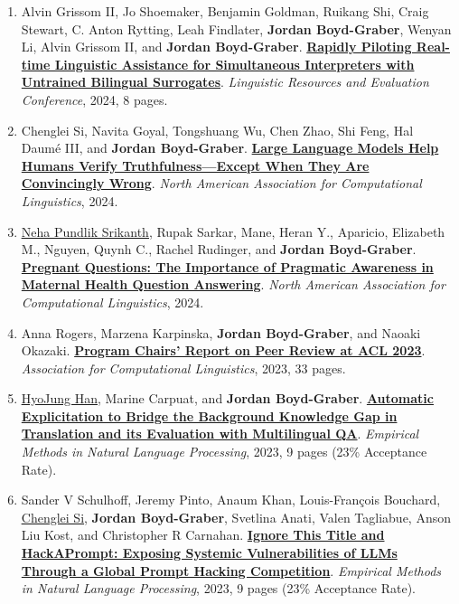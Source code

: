 {\begin{enumerate}
	 \item Alvin {Grissom II}, Jo Shoemaker, Benjamin Goldman, Ruikang Shi, Craig Stewart, C. Anton Rytting, Leah Findlater, {\bf Jordan Boyd-Graber}, Wenyan Li, Alvin {Grissom II}, and {\bf Jordan Boyd-Graber}.  {\bf \href{http://cs.umd.edu/~jbg//docs/2024_lrec_siminthelp.pdf}{Rapidly Piloting Real-time Linguistic Assistance for Simultaneous Interpreters with Untrained Bilingual Surrogates}}.  \emph{Linguistic Resources and Evaluation Conference}, 2024, 8 pages.

	 \item Chenglei Si, Navita Goyal, Tongshuang Wu, Chen Zhao, Shi Feng, Hal Daum\'{e} {III}, and {\bf Jordan Boyd-Graber}.  {\bf \href{http://cs.umd.edu/~jbg//docs/2024_naacl_convincingly.pdf}{Large Language Models Help Humans Verify Truthfulness---Except When They Are Convincingly Wrong}}.  \emph{North American Association for Computational Linguistics}, 2024.

	 \item \underline{\href{https://nehasrikn.github.io/}{Neha Pundlik Srikanth}}, Rupak Sarkar, Mane, Heran Y., Aparicio, Elizabeth M., Nguyen, Quynh C., Rachel Rudinger, and {\bf Jordan Boyd-Graber}.  {\bf \href{http://cs.umd.edu/~jbg//docs/2024_naacl_pregnant.pdf}{Pregnant Questions: The Importance of Pragmatic Awareness in Maternal Health Question Answering}}.  \emph{North American Association for Computational Linguistics}, 2024.

	 \item Anna Rogers, Marzena Karpinska, {\bf Jordan Boyd-Graber}, and Naoaki Okazaki.  {\bf \href{http://cs.umd.edu/~jbg//docs/2023_acl_peer_review_report.pdf}{Program Chairs' Report on Peer Review at ACL 2023}}.  \emph{Association for Computational Linguistics}, 2023, 33 pages.

	 \item \underline{\href{https://h-j-han.github.io/}{HyoJung Han}}, Marine Carpuat, and {\bf Jordan Boyd-Graber}.  {\bf \href{http://cs.umd.edu/~jbg//docs/2023_emnlp_explicitation.pdf}{Automatic Explicitation to Bridge the Background Knowledge Gap in Translation and its Evaluation with Multilingual QA}}.  \emph{Empirical Methods in Natural Language Processing}, 2023, 9 pages (23\% Acceptance Rate).

	 \item Sander V Schulhoff, Jeremy Pinto, Anaum Khan, Louis-François Bouchard, \underline{\href{https://noviscl.github.io}{Chenglei Si}}, {\bf Jordan Boyd-Graber}, Svetlina Anati, Valen Tagliabue, Anson Liu Kost, and Christopher R Carnahan.  {\bf \href{http://cs.umd.edu/~jbg//docs/2023_emnlp_hackaprompt.pdf}{Ignore This Title and HackAPrompt: Exposing Systemic Vulnerabilities of LLMs Through a Global Prompt Hacking Competition}}.  \emph{Empirical Methods in Natural Language Processing}, 2023, 9 pages (23\% Acceptance Rate).


\end{enumerate}}
